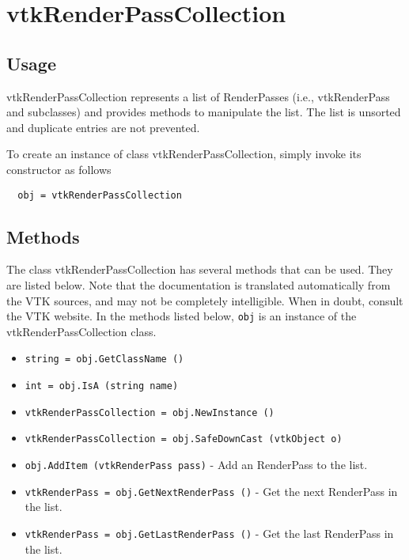 \section{vtkRenderPassCollection}

\subsection{Usage}

 vtkRenderPassCollection represents a list of RenderPasses
 (i.e., vtkRenderPass and subclasses) and provides methods to manipulate the
 list. The list is unsorted and duplicate entries are not prevented.

To create an instance of class vtkRenderPassCollection, simply
invoke its constructor as follows
\begin{verbatim}
  obj = vtkRenderPassCollection
\end{verbatim}
\subsection{Methods}

The class vtkRenderPassCollection has several methods that can be used.
  They are listed below.
Note that the documentation is translated automatically from the VTK sources,
and may not be completely intelligible.  When in doubt, consult the VTK website.
In the methods listed below, \verb|obj| is an instance of the vtkRenderPassCollection class.
\begin{itemize}
\item  \verb|string = obj.GetClassName ()|

\item  \verb|int = obj.IsA (string name)|

\item  \verb|vtkRenderPassCollection = obj.NewInstance ()|

\item  \verb|vtkRenderPassCollection = obj.SafeDownCast (vtkObject o)|

\item  \verb|obj.AddItem (vtkRenderPass pass)| -  Add an RenderPass to the list.

\item  \verb|vtkRenderPass = obj.GetNextRenderPass ()| -  Get the next RenderPass in the list.

\item  \verb|vtkRenderPass = obj.GetLastRenderPass ()| -  Get the last RenderPass in the list.

\end{itemize}

